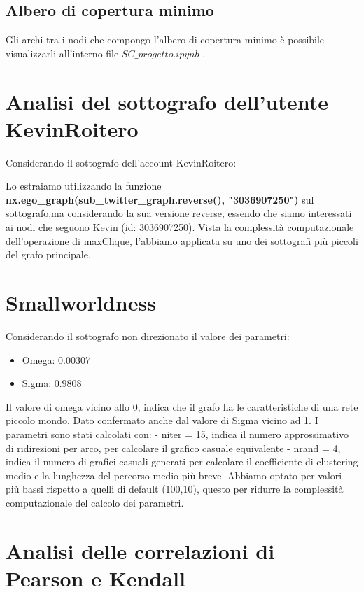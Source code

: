 \documentclass[a4paper,11pt]{report}
\begin{document}
\subsection{Albero di copertura minimo}
Gli archi tra i nodi che compongo l'albero di copertura minimo è possibile visualizzarli all'interno file $SC\_progetto.ipynb$ .

\section{Analisi del sottografo dell'utente KevinRoitero}
Considerando il sottografo dell'account KevinRoitero:

Lo estraiamo utilizzando la funzione \textbf{nx.ego\_graph(sub\_twitter\_graph.reverse(), "3036907250")} sul sottografo,ma considerando la sua versione reverse, essendo che siamo interessati ai nodi che seguono Kevin (id: 3036907250).
Vista la complessità computazionale dell'operazione di maxClique, l'abbiamo applicata su uno dei sottografi più piccoli del grafo principale. 

\section{Smallworldness}
Considerando il sottografo non direzionato il valore dei parametri:
	\begin{itemize}
	\item Omega: 0.00307
	\item Sigma: 0.9808
\end{itemize}
Il valore di omega vicino allo 0, indica che il grafo ha le caratteristiche di una rete piccolo mondo.
Dato confermato anche dal valore di Sigma vicino ad 1.
I parametri sono stati calcolati con:\newline
- niter = 15, indica il numero approssimativo di ridirezioni per arco, per calcolare il grafico casuale equivalente\newline
- nrand = 4, indica il numero di grafici casuali generati per calcolare il coefficiente di clustering medio e la lunghezza del percorso medio più breve.\newline
Abbiamo optato per valori più bassi rispetto a quelli di default (100,10), questo per ridurre la complessità computazionale del calcolo dei parametri.
\pagebreak
\section{Analisi delle correlazioni di Pearson e Kendall}
\end{document}
